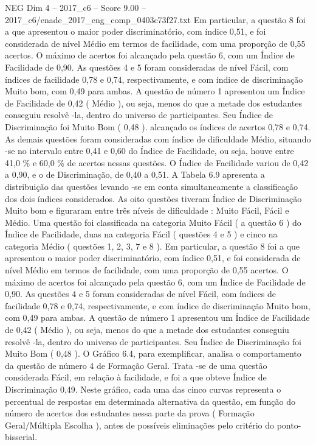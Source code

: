 \begin{textsample}{NEG Dim 4 – 2017\_c6 – Score 9.00 – 2017\_c6/enade\_2017\_eng\_comp\_0403c73f27.txt}
Em particular, a questão 8 foi a que apresentou o maior poder discriminatório, com índice 0,51, e foi considerada de nível Médio em termos de facilidade, com uma proporção de 0,55 acertos.
O máximo de acertos foi alcançado pela questão 6, com um Índice de Facilidade de 0,90.
As questões 4 e 5 foram consideradas de nível Fácil, com índices de facilidade 0,78 e 0,74, respectivamente, e com índice de discriminação Muito bom, com 0,49 para ambas.
A questão de número 1 apresentou um Índice de Facilidade de 0,42 ( Médio ), ou seja, menos do que a metade dos estudantes conseguiu resolvê -la, dentro do universo de participantes.
Seu Índice de Discriminação foi Muito Bom ( 0,48 ). alcançado os índices de acertos 0,78 e 0,74.
As demais questões foram consideradas com índice de dificuldade Médio, situando -se no intervalo entre 0,41 e 0,60 do Índice de Facilidade, ou seja, houve entre 41,0 \% e 60,0 \% de acertos nessas questões.
O Índice de Facilidade variou de 0,42 a 0,90, e o de Discriminação, de 0,40 a 0,51.
A Tabela 6.9 apresenta a distribuição das questões levando -se em conta simultaneamente a classificação dos dois índices considerados.
As oito questões tiveram Índice de Discriminação Muito bom e figuraram entre três níveis de dificuldade : Muito Fácil, Fácil e Médio.
Uma questão foi classificada na categoria Muito Fácil ( a questão 6 ) do Índice de Facilidade, duas na categoria Fácil ( questões 4 e 5 ) e cinco na categoria Médio ( questões 1, 2, 3, 7 e 8 ).
Em particular, a questão 8 foi a que apresentou o maior poder discriminatório, com índice 0,51, e foi considerada de nível Médio em termos de facilidade, com uma proporção de 0,55 acertos.
O máximo de acertos foi alcançado pela questão 6, com um Índice de Facilidade de 0,90.
As questões 4 e 5 foram consideradas de nível Fácil, com índices de facilidade 0,78 e 0,74, respectivamente, e com índice de discriminação Muito bom, com 0,49 para ambas.
A questão de número 1 apresentou um Índice de Facilidade de 0,42 ( Médio ), ou seja, menos do que a metade dos estudantes conseguiu resolvê -la, dentro do universo de participantes.
Seu Índice de Discriminação foi Muito Bom ( 0,48 ).
O Gráfico 6.4, para exemplificar, analisa o comportamento da questão de número 4 de Formação Geral.
Trata -se de uma questão considerada Fácil, em relação à facilidade, e foi a que obteve Índice de Discriminação 0,49.
Neste gráfico, cada uma das cinco curvas representa o percentual de respostas em determinada alternativa da questão, em função do número de acertos dos estudantes nessa parte da prova ( Formação Geral/Múltipla Escolha ), antes de possíveis eliminações pelo critério do ponto-bisserial.

\end{textsample}
